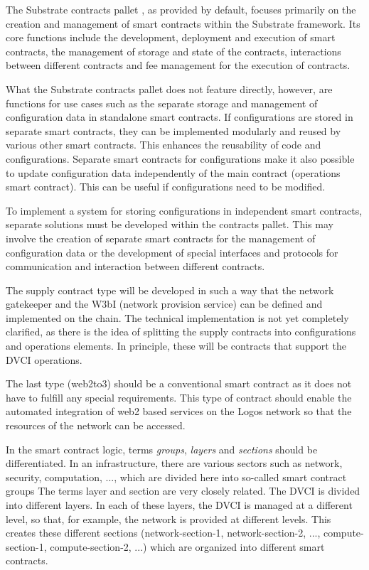 \documentclass[]{article}
\begin{document}
The Substrate contracts pallet \cite{sub-contract-pallet}, as provided by default, focuses primarily on the creation and management of smart contracts within the Substrate framework. 
Its core functions include the development, deployment and execution of smart contracts, the management of storage and state of the contracts, interactions between different contracts and fee management for the execution of contracts. 

What the Substrate contracts pallet does not feature directly, however, are functions for use cases such as the separate storage and management of configuration data in standalone smart contracts.
If configurations are stored in separate smart contracts, they can be implemented modularly and reused by various other smart contracts. This enhances the reusability of code and configurations.
Separate smart contracts for configurations make it also possible to update configuration data independently of the main contract (operations smart contract). 
This can be useful if configurations need to be modified.

To implement a system for storing configurations in independent smart contracts, separate solutions must be developed within the contracts pallet. 
This may involve the creation of separate smart contracts for the management of configuration data or the development of special interfaces and protocols for communication and interaction between different contracts.

The supply contract type will be developed in such a way that the network gatekeeper and the W3bI (network provision service) can be defined and implemented on the chain. 
The technical implementation is not yet completely clarified, as there is the idea of splitting the supply contracts into configurations and operations elements. 
In principle, these will be contracts that support the DVCI operations.

The last type (web2to3) should be a conventional smart contract as it does not have to fulfill any special requirements.
This type of contract should enable the automated integration of web2 based services on the Logos network so that the resources of the network can be accessed.

In the smart contract logic, terms \textit{groups}, \textit{layers} and \textit{sections} should be differentiated.
In an infrastructure, there are various sectors such as network, security, computation, ..., which are divided here into so-called smart contract groups
The terms layer and section are very closely related. 
The DVCI is divided into different layers. 
In each of these layers, the DVCI is managed at a different level, so that, for example, the network is provided at different levels.
This creates these different sections (network-section-1, network-section-2, ..., compute-section-1, compute-section-2, ...) which are organized into different smart contracts.
\end{document}
